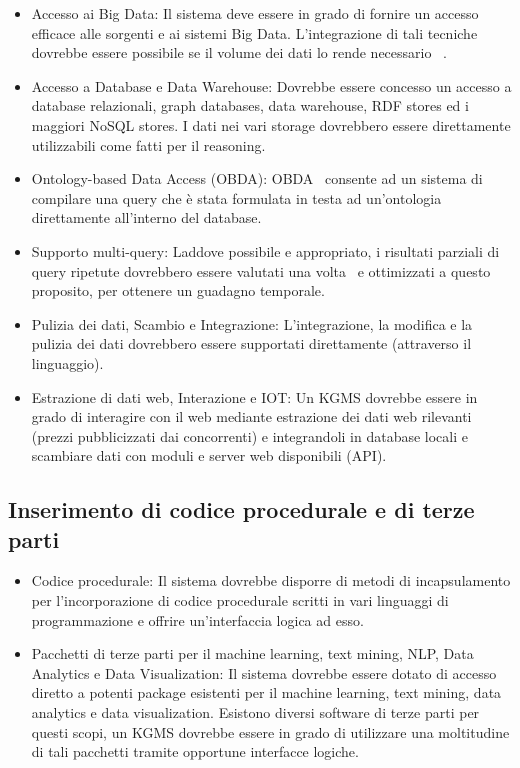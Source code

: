 \begin{itemize}
	\item Accesso ai Big Data: Il sistema deve essere in grado di fornire un accesso efficace alle sorgenti e ai sistemi Big Data. L'integrazione di tali tecniche dovrebbe essere possibile se il volume dei dati lo rende necessario ~\cite{shkapsky2016big}.
	\item Accesso a Database e Data Warehouse: Dovrebbe essere concesso un accesso a database relazionali, graph databases, data warehouse, RDF stores ed i maggiori NoSQL stores. I dati nei vari storage dovrebbero essere direttamente utilizzabili come fatti per il reasoning.
	\item Ontology-based Data Access (OBDA): OBDA~\cite{calvanese2011mastro} consente ad un sistema di compilare una query che è stata formulata in testa ad un'ontologia direttamente all'interno del database.
	\item Supporto multi-query: Laddove possibile e appropriato, i risultati parziali di query ripetute dovrebbero essere valutati una volta~\cite{roy2000efficient} e ottimizzati a questo proposito, per ottenere un guadagno temporale.
	\item Pulizia dei dati, Scambio e Integrazione: L'integrazione, la modifica e la pulizia dei dati dovrebbero essere supportati direttamente (attraverso il linguaggio).
	\item Estrazione di dati web, Interazione e IOT: Un KGMS dovrebbe essere in grado di interagire con il web mediante estrazione dei dati web rilevanti (prezzi pubblicizzati dai concorrenti) e integrandoli in database locali e scambiare dati con moduli e server web disponibili (API).
\end{itemize}

\subsection{Inserimento di codice procedurale e di terze parti}

\begin{itemize}
	\item Codice procedurale: Il sistema dovrebbe disporre di metodi di incapsulamento per l'incorporazione di codice procedurale scritti in vari linguaggi di programmazione e offrire un'interfaccia logica ad esso.
	\item Pacchetti di terze parti per il machine learning, text mining, NLP, Data Analytics e Data Visualization: Il sistema dovrebbe essere dotato di accesso diretto a potenti package esistenti per il machine learning, text mining, data analytics e data visualization. Esistono diversi software di terze parti per questi scopi, un KGMS dovrebbe essere in grado di utilizzare una moltitudine di tali pacchetti tramite opportune interfacce logiche.
\end{itemize}

